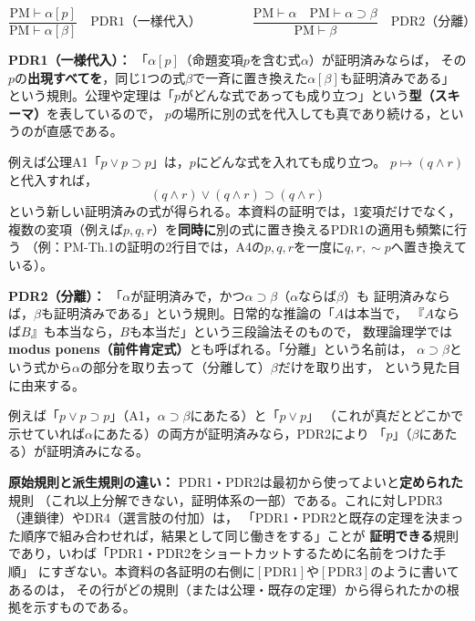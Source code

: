 \documentclass[autodetect-engine,dvi=dvipdfmx,ja=standard]{bxjsarticle}
\begin{document}
\begin{center}
\[
  \frac{\mathrm{PM}\vdash\alpha[p]}{\mathrm{PM}\vdash\alpha[\beta]}\quad\mathrm{PDR1（一様代入）}
  \qquad\qquad
  \frac{\mathrm{PM}\vdash\alpha\quad\mathrm{PM}\vdash\alpha\supset\beta}{\mathrm{PM}\vdash\beta}\quad\mathrm{PDR2（分離）}
\]
\end{center}

\textbf{PDR1（一様代入）：} 「\(\alpha[p]\)（命題変項\(p\)を含む式\(\alpha\)）が証明済みならば，
その\(p\)の\textbf{出現すべてを}，同じ1つの式\(\beta\)で一斉に置き換えた\(\alpha[\beta]\)も証明済みである」
という規則。公理や定理は「\(p\)がどんな式であっても成り立つ」という\textbf{型（スキーマ）}を表しているので，
\(p\)の場所に別の式を代入しても真であり続ける，というのが直感である。

例えば公理A1「\(p\lor p\supset p\)」は，\(p\)にどんな式を入れても成り立つ。
\(p\mapsto(q\land r)\)と代入すれば，
\[
  (q\land r)\lor(q\land r)\supset(q\land r)
\]
という新しい証明済みの式が得られる。本資料の証明では，1変項だけでなく，
複数の変項（例えば\(p,q,r\)）を\textbf{同時に}別の式に置き換えるPDR1の適用も頻繁に行う
（例：PM-Th.1の証明の2行目では，A4の\(p,q,r\)を一度に\(q,r,\sim p\)へ置き換えている）。

\textbf{PDR2（分離）：} 「\(\alpha\)が証明済みで，かつ\(\alpha\supset\beta\)（\(\alpha\)ならば\(\beta\)）も
証明済みならば，\(\beta\)も証明済みである」という規則。日常的な推論の「\(A\)は本当で，
『\(A\)ならば\(B\)』も本当なら，\(B\)も本当だ」という三段論法そのもので，
数理論理学では\textbf{modus ponens（前件肯定式）}とも呼ばれる。「分離」という名前は，
\(\alpha\supset\beta\)という式から\(\alpha\)の部分を取り去って（分離して）\(\beta\)だけを取り出す，
という見た目に由来する。

例えば「\(p\lor p\supset p\)」（A1，\(\alpha\supset\beta\)にあたる）と「\(p\lor p\)」
（これが真だとどこかで示せていれば\(\alpha\)にあたる）の両方が証明済みなら，PDR2により
「\(p\)」（\(\beta\)にあたる）が証明済みになる。

\textbf{原始規則と派生規則の違い：} PDR1・PDR2は最初から使ってよいと\textbf{定められた}規則
（これ以上分解できない，証明体系の一部）である。これに対しPDR3（連鎖律）やDR4（選言肢の付加）は，
「PDR1・PDR2と既存の定理を決まった順序で組み合わせれば，結果として同じ働きをする」ことが
\textbf{証明できる}規則であり，いわば「PDR1・PDR2をショートカットするために名前をつけた手順」
にすぎない。本資料の各証明の右側に\([\mathrm{PDR1}]\)や\([\mathrm{PDR3}]\)のように書いてあるのは，
その行がどの規則（または公理・既存の定理）から得られたかの根拠を示すものである。
\end{document}
